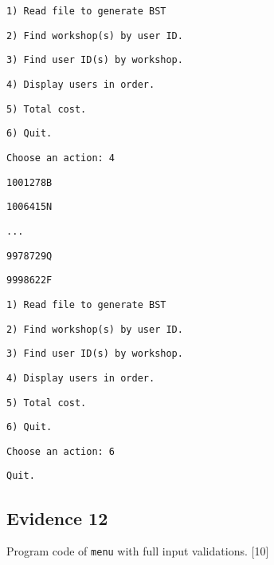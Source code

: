 \begin{minipage}[t]{1\columnwidth}
\texttt{1) Read file to generate BST }

\texttt{2) Find workshop(s) by user ID. }

\texttt{3) Find user ID(s) by workshop. }

\texttt{4) Display users in order. }

\texttt{5) Total cost. }

\texttt{6) Quit.}

\texttt{Choose an action: 4}

\texttt{1001278B }

\texttt{1006415N}

\texttt{... }

\texttt{9978729Q }

\texttt{9998622F}

\texttt{1) Read file to generate BST }

\texttt{2) Find workshop(s) by user ID.}

\texttt{3) Find user ID(s) by workshop. }

\texttt{4) Display users in order.}

\texttt{5) Total cost.}

\texttt{6) Quit. }

\texttt{Choose an action: 6}

\texttt{Quit. }%
\end{minipage}

\subsection*{Evidence 12 }

Program code of \texttt{menu} with full input validations. \hfill{}
{[}10{]}